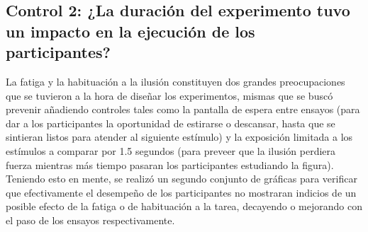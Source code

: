 \begin{itemize}

\end{itemize}




\subsection{Control 2: ¿La duración del experimento tuvo un impacto en la ejecución de los participantes?}

La fatiga y la habituación a la ilusión constituyen dos grandes preocupaciones que se tuvieron a la hora de diseñar los experimentos, mismas que se buscó prevenir añadiendo controles tales como la pantalla de espera entre ensayos (para dar a los participantes la oportunidad de estirarse o descansar, hasta que se sintieran listos para atender al siguiente estímulo) y la exposición limitada a los estímulos a comparar por 1.5 segundos (para preveer que la ilusión perdiera fuerza mientras más tiempo pasaran los participantes estudiando la figura). Teniendo esto en mente, se realizó un segundo conjunto de gráficas para verificar que efectivamente el desempeño de los participantes no mostraran indicios de un posible efecto de la fatiga  o de habituación a la tarea, decayendo o mejorando con el paso de los ensayos respectivamente.\\ 


